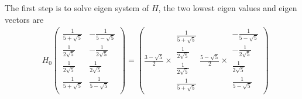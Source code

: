 The first step is to solve eigen system of $H$, the two lowest eigen values and eigen vectors are
\begin{equation}
\begin{split}
&H_0\begin{pmatrix}
\frac{1}{5+\sqrt{5}} & -\frac{1}{5-\sqrt{5}} \\
\frac{1}{2\sqrt{5}} & -\frac{1}{2\sqrt{5}} \\
\frac{1}{2\sqrt{5}} & \frac{1}{2\sqrt{5}} \\
\frac{1}{5+\sqrt{5}} & \frac{1}{5-\sqrt{5}} \\
\end{pmatrix}=
\left(
\frac{3-\sqrt{5}}{2}\times\begin{array}{c}
\frac{1}{5+\sqrt{5}}\\
\frac{1}{2\sqrt{5}}\\
\frac{1}{2\sqrt{5}}\\
\frac{1}{5+\sqrt{5}}
\end{array}
\frac{5-\sqrt{5}}{2}\times\begin{array}{c}
-\frac{1}{5-\sqrt{5}}\\
-\frac{1}{2\sqrt{5}}\\
\frac{1}{2\sqrt{5}}\\
\frac{1}{5-\sqrt{5}}\\
\end{array}
\right)
\end{split}
\end{equation} 


